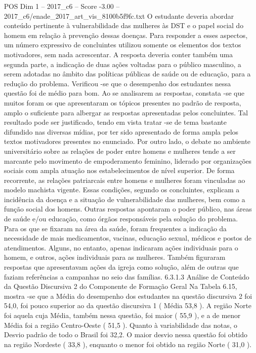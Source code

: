 \begin{textsample}{POS Dim 1 – 2017\_c6 – Score -3.00 – 2017\_c6/enade\_2017\_art\_vis\_8100b5f9fc.txt}
O estudante deveria abordar conteúdo pertinente à vulnerabilidade das mulheres às DST e o papel social do homem em relação à prevenção dessas doenças.
Para responder a esses aspectos, um número expressivo de concluintes utilizou somente os elementos dos textos motivadores, sem nada acrescentar.
A resposta deveria conter também uma segunda parte, a indicação de duas ações voltadas para o público masculino, a serem adotadas no âmbito das políticas públicas de saúde ou de educação, para a redução do problema.
Verificou -se que o desempenho dos estudantes nessa questão foi de médio para bom.
Ao se analisarem as respostas, constata -se que muitos foram os que apresentaram os tópicos presentes no padrão de resposta, amplo o suficiente para albergar as respostas apresentadas pelos concluintes.
Tal resultado pode ser justificado, tendo em vista tratar -se de tema bastante difundido nas diversas mídias, por ter sido apresentado de forma ampla pelos textos motivadores presentes no enunciado.
Por outro lado, o debate no ambiente universitário sobre as relações de poder entre homens e mulheres tende a ser marcante pelo movimento de empoderamento feminino, liderado por organizações sociais com ampla atuação nos estabelecimentos de nível superior.
De forma recorrente, as relações patriarcais entre homens e mulheres foram vinculadas ao modelo machista vigente.
Essas condições, segundo os concluintes, explicam a incidência da doença e a situação de vulnerabilidade das mulheres, bem como a função social dos homens.
Outras respostas apontaram o poder público, nas áreas de saúde e/ou educação, como órgãos responsáveis pela solução do problema.
Para os que se fixaram na área da saúde, foram frequentes a indicação da necessidade de mais medicamentos, vacinas, educação sexual, médicos e postos de atendimentos.
Alguns, no entanto, apenas indicaram ações individuais para o homem, e outros, ações individuais para as mulheres.
Também figuraram respostas que apresentavam ações da igreja como solução, além de outras que faziam referências a campanhas no seio das famílias. 6.3.1.3 Análise de Conteúdo da Questão Discursiva 2 do Componente de Formação Geral Na Tabela 6.15, mostra -se que a Média do desempenho dos estudantes na questão discursiva 2 foi 54,0, foi pouco superior ao da questão discursiva 1 ( Média 53,8 ).
A região Norte foi aquela cuja Média, também nessa questão, foi maior ( 55,9 ), e a de menor Média foi a região Centro-Oeste ( 51,5 ).
Quanto à variabilidade das notas, o Desvio padrão de todo o Brasil foi 32,2.
O maior desvio nessa questão foi obtido na região Nordeste ( 33,8 ), enquanto o menor foi obtido na região Norte ( 31,0 ).

\end{textsample}
